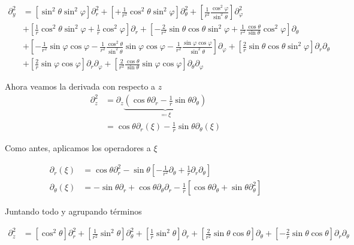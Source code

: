 \documentclass[11pt]{article}
\numberwithin{equation}{section}
\begin{document}
\begin{align*}
	\partial^2_{y}
	&=
	\left[
		\sin^2\theta \sin^2\varphi
	\right]
	\partial^2_r
	+
	\left[
		+\frac{1}{r^2} \cos^2\theta \sin^2\varphi
	\right]
	\partial^2_{\theta}
	+
	\left[
		\frac{1}{r^2} \frac{\cos^2\varphi}{\sin^2\theta}
	\right]
	\partial^2_{\varphi}
	\\&+
	\left[
		\frac{1}{r} \cos^2\theta \sin^2 \varphi
		+
		\frac{1}{r} \cos^2 \varphi
	\right]
	\partial_{r}
	+
	\left[
		-\frac{2}{r^2} \sin\theta \cos\theta \sin^2\varphi
		+
		\frac{1}{r^2} \frac{\cos\theta}{\sin\theta} \cos^2\varphi
	\right]
	\partial_{\theta}
	\\&+
	\left[
		-\frac{1}{r^2} \sin\varphi \cos\varphi
		-\frac{1}{r^2} \frac{\cos^2\theta}{\sin^2\theta} \sin\varphi \cos\varphi
		-\frac{1}{r^2} \frac{\sin\varphi \cos\varphi}{\sin^2\theta}
	\right]
	\partial_{\varphi}
	+
	\left[
		\frac{2}{r} \sin\theta\cos\theta \sin^2\varphi
	\right]
	\partial_{r} \partial_{\theta}
	\\&+
	\left[
		\frac{2}{r} \sin\varphi \cos\varphi
	\right]
	\partial_{r} \partial_{\varphi}
	+
	\left[
		\frac{2}{r^2} \frac{\cos\theta}{\sin\theta} \sin\varphi \cos\varphi
	\right]
	\partial_{\theta} \partial_{\varphi}
\end{align*}

Ahora veamos la derivada con respecto a \(z\)
\begin{align*}
	\partial^2_z
	&=
	\partial_z
	\underbrace{
	\left(
		\cos\theta \partial_{r}
		-
		\frac{1}{r} \sin\theta \partial_{\theta}
	\right)
	}_{\eqqcolon \xi}
	\\&=
	\cos\theta \partial_{r}(\xi)
	-
	\frac{1}{r} \sin\theta \partial_{\theta} (\xi)
\end{align*}

Como antes, aplicamos los operadores a \(\xi\)

\begin{align*}
	\partial_{r} (\xi)
	&=
	\cos\theta \partial^2_r
	-
	\sin\theta
	\left[
		-\frac{1}{r^2} \partial_{\theta}
		+
		\frac{1}{r} \partial_{r} \partial_{\theta}
	\right]
	\\
	\partial_{\theta} (\xi)
	&=
	- \sin\theta \partial_{r}
	+ \cos\theta \partial_{\theta} \partial_{r}
	- \frac{1}{r}
	\left[
		\cos\theta \partial_{\theta}
		+
		\sin\theta \partial^2_{\theta}
	\right]
\end{align*}

Juntando todo y agrupando términos

\begin{align*}
	\partial^2_{z}
	&=
	\left[
		\cos^2\theta
	\right]
	\partial^2_r
	+
	\left[
		\frac{1}{r^2} \sin^2\theta
	\right]
	\partial^2_{\theta}
	+
	\left[
		\frac{1}{r} \sin^2\theta
	\right]
	\partial_{r}
	+
	\left[
		\frac{2}{r^2} \sin\theta \cos\theta
	\right]
	\partial_{\theta}
	+
	\left[
		-\frac{2}{r} \sin\theta \cos\theta
	\right]
	\partial_{r} \partial_{\theta}
\end{align*}
\end{document}
